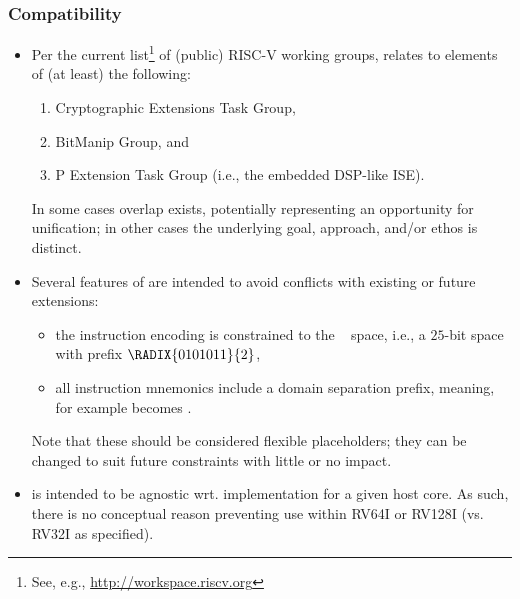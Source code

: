 
\subsubsection{Compatibility}

\begin{itemize}

\item Per the current list\footnote{
      See, e.g., \url{http://workspace.riscv.org}
      } of (public) RISC-V working groups, 
      \XCID relates to elements of (at least) the following:

      \begin{enumerate}
      \item Cryptographic Extensions Task Group,
      \item BitManip                      Group,
            and
      \item P             Extension  Task Group (i.e., the embedded DSP-like ISE).
      \end{enumerate}

      \noindent
      In some cases overlap exists, potentially representing an opportunity
      for unification; in other cases the underlying goal, approach, and/or
      ethos is distinct.

\item Several features of \XCID are intended to avoid conflicts with existing 
      or future extensions:

      \begin{itemize}
      \item the instruction encoding is constrained to the 
            ~\cite[Table 19.1]{SCARV:RV:ISA:I:17}
            space, i.e., a $25$-bit space with prefix $\RADIX{0101011}{2}$,
      \item all instruction mnemonics include a domain separation prefix,
            meaning, for example  becomes .
      \end{itemize}
      

      \noindent
      Note that these should be considered flexible placeholders; they can
      be changed to suit future constraints with little or no impact.

\item \XCID is intended to be agnostic wrt. implementation for a given host 
      core.  As such, there is no conceptual reason preventing use within
      RV64I or RV128I (vs. RV32I as specified).  

\end{itemize}

